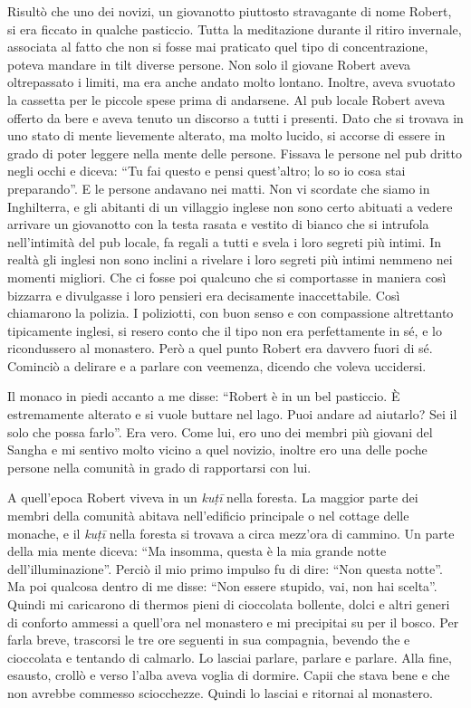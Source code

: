 Risultò che uno dei novizi, un giovanotto piuttosto stravagante di nome Robert, si era ficcato in qualche pasticcio. Tutta la meditazione durante il ritiro invernale, associata al fatto che non si fosse mai praticato quel tipo di concentrazione, poteva mandare in tilt diverse persone. Non solo il giovane Robert aveva oltrepassato i limiti, ma era anche andato molto lontano. Inoltre, aveva svuotato la cassetta per le piccole spese prima di andarsene. Al pub locale Robert aveva offerto da bere e aveva tenuto un discorso a tutti i presenti. Dato che si trovava in uno stato di mente lievemente alterato, ma molto lucido, si accorse di essere in grado di poter leggere nella mente delle persone. Fissava le persone nel pub dritto negli occhi e diceva: ``Tu fai questo e pensi quest'altro; lo so io cosa stai preparando''. E le persone andavano nei matti. Non vi scordate che siamo in Inghilterra, e gli abitanti di un villaggio inglese non sono certo abituati a vedere arrivare un giovanotto con la testa rasata e vestito di bianco che si intrufola nell'intimità del pub locale, fa regali a tutti e svela i loro segreti più intimi. In realtà gli inglesi non sono inclini a rivelare i loro segreti più intimi nemmeno nei momenti migliori. Che ci fosse poi qualcuno che si comportasse in maniera così bizzarra e divulgasse i loro pensieri era decisamente inaccettabile. Così chiamarono la polizia. I poliziotti, con buon senso e con compassione altrettanto tipicamente inglesi, si resero conto che il tipo non era perfettamente in sé, e lo ricondussero al monastero. Però a quel punto Robert era davvero fuori di sé. Cominciò a delirare e a parlare con veemenza, dicendo che voleva uccidersi.

Il monaco in piedi accanto a me disse: ``Robert è in un bel pasticcio. È estremamente alterato e si vuole buttare nel lago. Puoi andare ad aiutarlo? Sei il solo che possa farlo''. Era vero. Come lui, ero uno dei membri più giovani del Sangha e mi sentivo molto vicino a quel novizio, inoltre ero una delle poche persone nella comunità in grado di rapportarsi con lui.

A quell'epoca Robert viveva in un \textit{kuṭī }nella foresta. La maggior parte dei membri della comunità abitava nell'edificio principale o nel cottage delle monache, e il \textit{kuṭī }nella foresta si trovava a circa mezz'ora di cammino. Un parte della mia mente diceva: ``Ma insomma, questa è la mia grande notte dell'illuminazione''. Perciò il mio primo impulso fu di dire: ``Non questa notte''. Ma poi qualcosa dentro di me disse: ``Non essere stupido, vai, non hai scelta''. Quindi mi caricarono di thermos pieni di cioccolata bollente, dolci e altri generi di conforto ammessi a quell'ora nel monastero e mi precipitai su per il bosco. Per farla breve, trascorsi le tre ore seguenti in sua compagnia, bevendo the e cioccolata e tentando di calmarlo. Lo lasciai parlare, parlare e parlare. Alla fine, esausto, crollò e verso l'alba aveva voglia di dormire. Capii che stava bene e che non avrebbe commesso sciocchezze. Quindi lo lasciai e ritornai al monastero.

